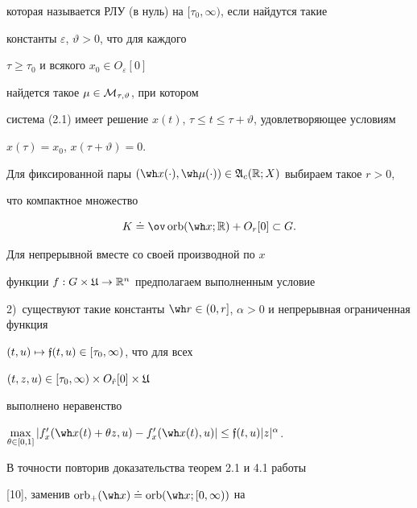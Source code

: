 которая называется РЛУ (в нуль) на $[\tau_0,\infty)$, если найдутся такие


константы $\varepsilon$, $\vartheta>0$, что для каждого


${\tau\ge\tau_0}$ и всякого $x_0\in O_{\varepsilon}[0]$


найдется такое $\mu\in\cal M_{\tau,\vartheta}$, при котором


система (2.1) имеет решение $x(t)$, $\tau\le


t\le\tau+\vartheta$, удовлетворяющее условиям


$x(\tau)=x_0$, $x(\tau+\vartheta)=0$.





Для фиксированной пары $(\wh x(\cdot),\wh\mu(\cdot))\in


\frak A_c(\Bbb R;X)$ выбираем такое $r>0$,


что компактное множество


\begin{equation}


K\doteq\ov\orb(\wh x;\Bbb R)+O_r[0]\subset G.


\end{equation}





Для непрерывной вместе со своей производной по $x$


функции $f:G\times\frak U\to\Bbb R^n$ предполагаем выполненным условие





2)~существуют такие константы $\wh


r\in(0,r]$, $\alpha>0$ и непрерывная ограниченная функция


$(t,u)\mapsto\frak f(t,u)\in[\tau_0,\infty)$, что для всех


$(t,z,u)\in[\tau_0,\infty)\times O_{\Hat r}[0]\times\frak U$


выполнено неравенство


$\max\limits_{\theta\in [0,1]}|f'_x(\wh x(t)+\theta


z,u)-f'_x(\wh x(t),u)|\le\frak f(t,u)|z|^\alpha$.





В точности повторив доказательства теорем 2.1 и 4.1 работы


[10], заменив $\orb_+(\wh x)


\doteq\orb(\wh x;[0,\infty))$ на



